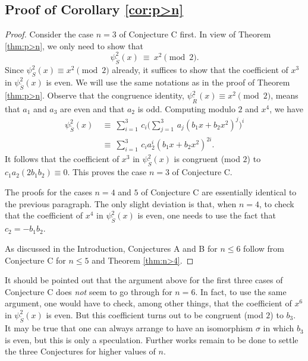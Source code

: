\documentclass[reqno,11pt]{amsart}
\numberwithin{equation}{subsection}  %
\begin{document}
\subsection{Proof of Corollary \ref{cor:p>n}}
\begin{proof}
Consider the case $n = 3$ of Conjecture C first.  In view of Theorem \ref{thm:p>n}, we only need to show that 
   \[
   \psi^2_{\tilde{S}}(x) ~\equiv~ x^2 \pmod{2}.
   \]
Since $\psi^2_S(x) \equiv x^2 \pmod{2}$ already, it suffices to show that the coefficient of $x^3$ in $\psi^2_{\tilde{S}}(x)$ is even.  We will use the same notations as in the proof of Theorem \ref{thm:p>n}.  Observe that the congruence identity, $\psi^2_{\tilde{R}}(x) \equiv x^2 \pmod{2}$, means that $a_1$ and $a_3$ are even and that $a_2$ is odd.  Computing modulo $2$ and $x^4$, we have
   \[
   \begin{split}
   \psi^2_{\tilde{S}}(x) 
   &~\equiv~ \sum_{i=1}^3\, c_i \biggl( \sum_{j=1}^3 \, a_j (b_1x + b_2x^2)^j \biggr)^i \\
   &~\equiv~ \sum_{i=1}^3\, c_i a_2^i(b_1x + b_2x^2)^{2i}.
   \end{split}
   \]
It follows that the coefficient of $x^3$ in $\psi^2_{\tilde{S}}(x)$ is congruent (mod $2$) to $c_1a_2(2b_1b_2) \equiv 0$.  This proves the case $n = 3$ of Conjecture C.


The proofs for the cases $n = 4$ and $5$ of Conjecture C are essentially identical to the previous paragraph.  The only slight deviation is that, when $n = 4$, to check that the coefficient of $x^4$ in $\psi^2_{\tilde{S}}(x)$ is even, one needs to use the fact that $c_2 = -b_1b_2$.


As discussed in the Introduction, Conjectures A and B for $n \leq 6$ follow from Conjecture C for $n \leq 5$ and Theorem \ref{thm:n>4}.
\end{proof}


It should be pointed out that the argument above for the first three cases of Conjecture C does \emph{not} seem to go through for $n = 6$.  In fact, to use the same argument, one would have to check, among other things, that the coefficient of $x^6$ in $\psi^2_{\tilde{S}}(x)$ is even.  But this coefficient turns out to be congruent (mod $2$) to $b_3$.  It may be true that one can always arrange to have an isomorphism $\sigma$ in which $b_3$ is even, but this is only a speculation.  Further works remain to be done to settle the three Conjectures for higher values of $n$.



\end{document}
